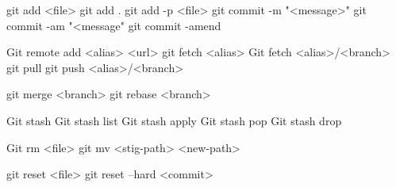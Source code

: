 \documentclass[twocolumn]{article}
\begin{document}
git add <file>
git add .
git add -p <file>
git commit -m "<message>"
git commit -am "<message"
git commit -amend 


Git remote add <alias> <url>
git fetch <alias>
Git fetch <alias>/<branch>
git pull
git push <alias>/<branch>


git merge <branch>
git rebase <branch>

Git stash
Git stash list
Git stash apply
Git stash pop
Git stash drop

Git rm <file>
git mv <stig-path> <new-path>


git reset <file>
git reset --hard <commit>
\end{document}
